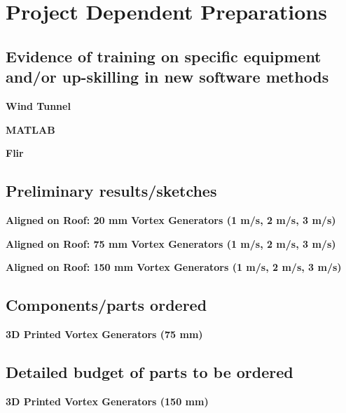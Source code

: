 \section{Project Dependent Preparations}

\subsection{Evidence of training on specific equipment and/or up-skilling in new software methods}
\noindent \textbf{Wind Tunnel}\par
\noindent \textbf{MATLAB}\par
\noindent \textbf{Flir}\par

\subsection{Preliminary results/sketches}
\noindent \textbf{Aligned on Roof: 20 mm Vortex Generators (1 m/s, 2 m/s, 3 m/s)}\par
\noindent \textbf{Aligned on Roof: 75 mm Vortex Generators (1 m/s, 2 m/s, 3 m/s)}\par
\noindent \textbf{Aligned on Roof: 150 mm Vortex Generators (1 m/s, 2 m/s, 3 m/s)}\par

\subsection{Components/parts ordered}
\noindent \textbf{3D Printed Vortex Generators (75 mm)}\par

\subsection{Detailed budget of parts to be ordered}\par
\noindent \textbf{3D Printed Vortex Generators (150 mm)}\par


